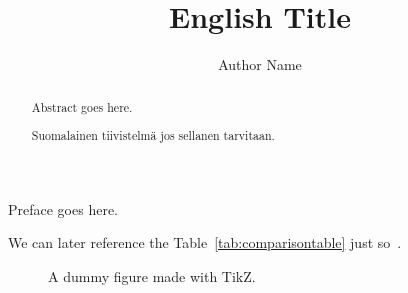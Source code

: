 \documentclass{tut-thesis}
\author 	{Author Name}
\title 		[Suomenkielinen otsikko]   {English Title}
\date 		{\Today} %
\begin{document}
\maketitle

\frontmatter
\begin{abstract}
	Abstract goes here.
\end{abstract}

\begin{otherlanguage}{finnish}
	\begin{abstract}
		Suomalainen tiivistelmä jos sellanen tarvitaan.
	\end{abstract}
\end{otherlanguage}

\begin{preface}
	Preface goes here.
\end{preface}

\tableofcontents
\listoftables
\listoffigures

\printglossary

\mainmatter
\blinddocument %
\blindtext %

We can later reference the Table~\ref{tab:comparisontable} just so~\autocite{Doe2015}. \blindtext %

\begin{figure}
	\centering
	\caption{A dummy figure made with TikZ.}
	\label{fig:dummyfigure}
\end{figure}
\end{document}
